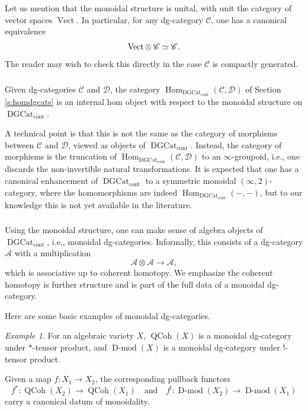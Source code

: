 \documentclass[10pt]{amsart}
\newcommand{\udHom}{\on{Hom}_{\DGCat}}
\newcommand{\on}{\operatorname}
\newcommand{\Dmod}{\on{D-mod}}
\newcommand{\Vect}{\on{Vect}}
\theoremstyle{remark}
\newtheorem{ex}[subsubsection]{Example}
\newcommand{\sA}{\mathscr{A}}
\newcommand{\sD}{\mathscr{D}}
\numberwithin{equation}{section}
\newcommand{\sC}{\mathscr{C}}
\newcommand{\msf}{\operatorname}
\newcommand{\QCoh}{\on{QCoh}}
\newcommand{\DGCat}{\msf{DGCat}_{\on{cont}}}
\begin{document}
Let us mention that the monoidal structure is unital, with unit the category of 
vector spaces $\Vect$. In particular, for any dg-category $\sC$, one has a 
canonical equivalence 
%
\[
   \Vect \otimes \hspace{.7mm}  \sC \simeq \sC. 
\]
%
The reader may wish to check this directly in the case $\sC$ is compactly 
generated. 


\subsubsection{} Given dg-categories $\sC$ and $\sD$, the category $\udHom(\sC, 
\sD)$ of Section \ref{s:homdgcats} is an internal hom object with respect to 
the monoidal structure on $\DGCat$. 


A technical point is that this is not 
the same as the category of morphisms between $\sC$ and $\sD$, viewed as objects of 
$\DGCat$. Instead, the 
category of morphisms is the truncation of 
$\udHom(\sC, \sD)$ to an $\infty$-groupoid, i.e., one discards the non-invertible 
natural 
transformations. It is expected that one has a canonical enhancement of 
$\DGCat$ to a
symmetric monoidal $(\infty,2)$-category, where the homomorphisms are indeed 
$\udHom(-, -)$, but to our knowledge this is not yet available in the 
literature.  




\subsubsection{} Using the monoidal structure, one can make sense of algebra 
objects of $\DGCat$, i.e., monoidal dg-categories. Informally, this 
consists of a dg-category $\sA$ with a multiplication 
%
\[
    \sA \otimes \sA \rightarrow \sA,
\]
%
which is associative up to coherent homotopy. We emphasize the coherent homotopy 
is further structure and is part of the full data of a monoidal dg-category. 


 
 Here are some basic examples of monoidal dg-categories. 
 
 \begin{ex}\label{ex:qcohalg} For an algebraic variety $X$, $\QCoh(X)$ is a 
 monoidal dg-category 
 under $*$-tensor product, and $\Dmod(X)$ is a monoidal dg-category under 
 $!$-tensor product. 	
 
 Given a map $f: X_1 \rightarrow X_2$, the corresponding pullback functors 
 \[
 f^*: \QCoh(X_2) \rightarrow \QCoh(X_1) \quad \text{and} \quad f^!: \Dmod(X_2) 
 \rightarrow \Dmod(X_1)
 \]
 carry a canonical datum of monoidality. 
 \end{ex}
\end{document}
